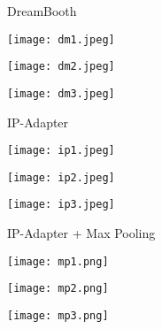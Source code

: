 \documentclass{article}
\begin{document}
\begin{figure}[H]
\begin{figure}[H]
\begin{minipage}{.25\textwidth}
    \centering
    DreamBooth
    \label{fig:dm0}
\end{minipage}%
\begin{minipage}{.25\textwidth}
    \centering
    \texttt{[image: dm1.jpeg]}
    \label{fig:dm1}
\end{minipage}%
\begin{minipage}{.25\textwidth}
    \centering
    \texttt{[image: dm2.jpeg]}
    \label{fig:dm2}
\end{minipage}%
\begin{minipage}{.25\textwidth}
    \centering
    \texttt{[image: dm3.jpeg]}
    \label{fig:dm3}
\end{minipage}%
\end{figure}

\vspace{-25pt}

\begin{figure}[H]
\begin{minipage}{.25\textwidth}
    \centering
    IP-Adapter
    \label{fig:ip0}
\end{minipage}%
\begin{minipage}{.25\textwidth}
    \centering
    \texttt{[image: ip1.jpeg]}
    \label{fig:ip1}
\end{minipage}%
\begin{minipage}{.25\textwidth}
    \centering
    \texttt{[image: ip2.jpeg]}
    \label{fig:ip2}
\end{minipage}%
\begin{minipage}{.25\textwidth}
    \centering
    \texttt{[image: ip3.jpeg]}
    \label{fig:ip3}
\end{minipage}%
\end{figure}

\vspace{-25pt}

\begin{figure}[H]
\begin{minipage}{.25\textwidth}
    \centering
    IP-Adapter + Max Pooling
    \label{fig:mp0}
\end{minipage}%
\begin{minipage}{.25\textwidth}
    \centering
    \texttt{[image: mp1.png]}
    \label{fig:mp1}
\end{minipage}%
\begin{minipage}{.25\textwidth}
    \centering
    \texttt{[image: mp2.png]}
    \label{fig:mp2}
\end{minipage}%
\begin{minipage}{.25\textwidth}
    \centering
    \texttt{[image: mp3.png]}
    \label{fig:mp3}
\end{minipage}%
\end{figure}


\end{figure}
\end{document}
